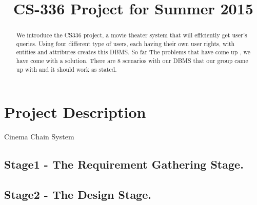 \documentclass[10pt,conference]{IEEEtran}
\begin{document}
\title{CS-336 Project for Summer 2015}
\author{
\and
{}
\and
{}
}


\maketitle


\begin{abstract}
\textnormal{
We introduce the CS336 project, a movie theater system that will efficiently get user's queries. Using four different type of users, each having their own user rights, with entities and attributes creates this DBMS. So far The problems that have come up , we have come with a solution. There are 8 scenarios with our DBMS that our group came up with and it should work as stated.
}
\end{abstract}

\IEEEpeerreviewmaketitle
\section{Project Description}\label{sec:1. Project Description}
%
\textnormal{
Cinema Chain System
}
\subsection{Stage1 - The Requirement Gathering Stage. }\label{sec:1.	Requirement Gathering Stage. }



\subsection{Stage2 - The Design Stage. }\label{sec: 2:The Design Stage.}

\end{document}
